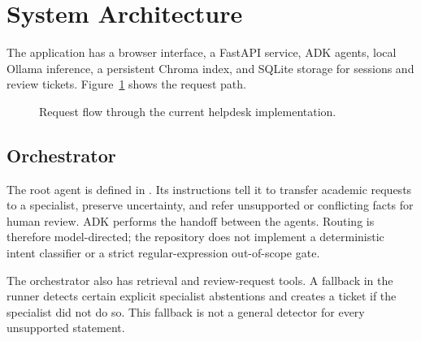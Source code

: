 \documentclass[11pt,a4paper]{article}
\begin{document}
\section{System Architecture}
The application has a browser interface, a FastAPI service, ADK agents, local Ollama inference, a persistent Chroma index, and SQLite storage for sessions and review tickets. Figure~\ref{fig:architecture} shows the request path.

\begin{figure}[htbp]
\centering
{}
\caption{Request flow through the current helpdesk implementation.}
\label{fig:architecture}
\end{figure}

\subsection{Orchestrator}
The root agent is defined in . Its instructions tell it to transfer academic requests to a specialist, preserve uncertainty, and refer unsupported or conflicting facts for human review. ADK performs the handoff between the agents. Routing is therefore model-directed; the repository does not implement a deterministic intent classifier or a strict regular-expression out-of-scope gate.

The orchestrator also has retrieval and review-request tools. A fallback in the runner detects certain explicit specialist abstentions and creates a ticket if the specialist did not do so. This fallback is not a general detector for every unsupported statement.
\end{document}
